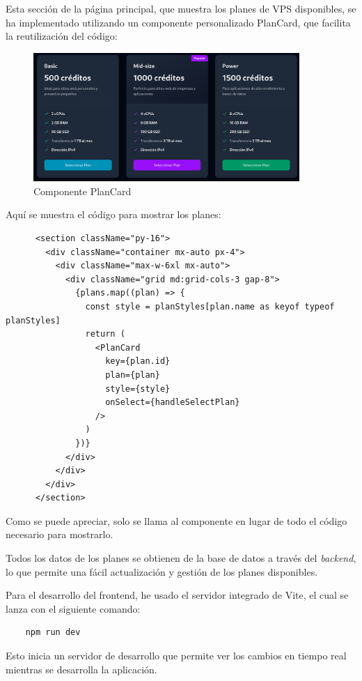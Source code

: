\documentclass[11pt,oneside,a4paper]{book}
\begin{document}
Esta sección de la página principal, que muestra los planes de VPS disponibles, se ha implementado utilizando un componente personalizado PlanCard, que facilita la reutilización del código:
\begin{figure}[h]
\caption{Componente PlanCard}
\centering
\includegraphics[width=0.9\textwidth]{img/cards.png}
\end{figure}

\newpage
Aquí se muestra el código para mostrar los planes:
\begin{verbatim}
      <section className="py-16">
        <div className="container mx-auto px-4">
          <div className="max-w-6xl mx-auto">
            <div className="grid md:grid-cols-3 gap-8">
              {plans.map((plan) => {
                const style = planStyles[plan.name as keyof typeof planStyles]
                return (
                  <PlanCard 
                    key={plan.id}
                    plan={plan}
                    style={style}
                    onSelect={handleSelectPlan}
                  />
                )
              })}
            </div>
          </div>
        </div>
      </section>
\end{verbatim}

Como se puede apreciar, solo se llama al componente en lugar de todo el código necesario para mostrarlo.

Todos los datos de los planes se obtienen de la base de datos a través del \textit{backend}, lo que permite una fácil actualización y gestión de los planes disponibles.

Para el desarrollo del frontend, he usado el servidor integrado de Vite, el cual se lanza con el siguiente comando:
\begin{verbatim}
    npm run dev
\end{verbatim} 
Esto inicia un servidor de desarrollo que permite ver los cambios en tiempo real mientras se desarrolla la aplicación.
\end{document}
